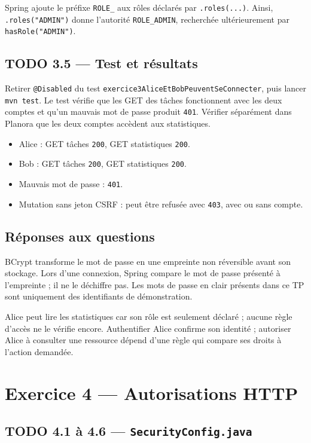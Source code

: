 \documentclass[11pt,a4paper]{article}
\begin{document}
Spring ajoute le préfixe \texttt{ROLE\_} aux rôles déclarés par \texttt{.roles(...)}. Ainsi, \texttt{.roles("ADMIN")} donne l’autorité \texttt{ROLE\_ADMIN}, recherchée ultérieurement par \texttt{hasRole("ADMIN")}.

\subsection{TODO 3.5 — Test et résultats}

Retirer \texttt{@Disabled} du test \texttt{exercice3AliceEtBobPeuventSeConnecter}, puis lancer \texttt{mvn test}. Le test vérifie que les GET des tâches fonctionnent avec les deux comptes et qu’un mauvais mot de passe produit \texttt{401}. Vérifier séparément dans Planora que les deux comptes accèdent aux statistiques.

\begin{itemize}
\item Alice : GET tâches \texttt{200}, GET statistiques \texttt{200}.
\item Bob : GET tâches \texttt{200}, GET statistiques \texttt{200}.
\item Mauvais mot de passe : \texttt{401}.
\item Mutation sans jeton CSRF : peut être refusée avec \texttt{403}, avec ou sans compte.
\end{itemize}

\subsection{Réponses aux questions}

BCrypt transforme le mot de passe en une empreinte non réversible avant son stockage. Lors d’une connexion, Spring compare le mot de passe présenté à l’empreinte ; il ne le déchiffre pas. Les mots de passe en clair présents dans ce TP sont uniquement des identifiants de démonstration.

Alice peut lire les statistiques car son rôle est seulement déclaré ; aucune règle d’accès ne le vérifie encore. Authentifier Alice confirme son identité ; autoriser Alice à consulter une ressource dépend d’une règle qui compare ses droits à l’action demandée.

\section{Exercice 4 — Autorisations HTTP}

\subsection{TODO 4.1 à 4.6 — \texttt{SecurityConfig.java}}
\end{document}
